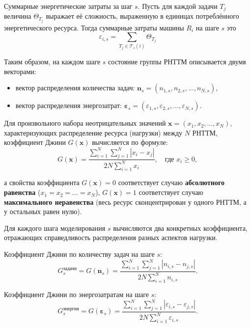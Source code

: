 Суммарные энергетические затраты за шаг $s$. Пусть для каждой задачи $T_j$ величина $\Theta_{T_j}$ выражает её сложность, выраженную в единицах потреблённого энергетического ресурса. Тогда суммарные затраты машины $R_i$ на шаге $s$ это
\begin{equation}
	\varepsilon_{i,s} = \sum_{T_j \in \mathcal{T}_s(i)} \Theta_{T_j}
\end{equation}

Таким образом, на каждом шаге $s$ состояние группы РНТТМ описывается двумя векторами:
\begin{itemize}
	\item вектор распределения количества задач: $\mathbf{n}_s = (n_{1,s}, n_{2,s}, \dots, n_{N,s})$,
	\item вектор распределения энергозатрат: $\boldsymbol{\varepsilon}_s = (\varepsilon_{1,s}, \varepsilon_{2,s}, \dots, \varepsilon_{N,s})$.
\end{itemize}

Для произвольного набора неотрицательных значений $\mathbf{x} = (x_1, x_2, \dots, x_N)$, характеризующих распределение ресурса (нагрузки) между $N$ РНТТМ, коэффициент Джини $G(\mathbf{x})$ вычисляется по формуле:
\begin{equation}
	\label{eq:gini_co}
	G(\mathbf{x}) = \frac{\displaystyle \sum_{i=1}^{N} \sum_{j=1}^{N} |x_i - x_j|}{\displaystyle 2 N \sum_{i=1}^{N} x_i}, \quad \text{где } x_i \ge 0,
\end{equation}

а свойства коэффициента $G(\mathbf{x}) = 0$ соответствует случаю \textbf{абсолютного равенства} ($x_1 = x_2 = \dots = x_N$), $G(\mathbf{x}) = 1$ соответствует случаю \textbf{максимального неравенства} (весь ресурс сконцентрирован у одного РНТТМ, а у остальных равен нулю).

Для каждого шага моделирования $s$ вычисляются два конкретных коэффициента, отражающих справедливость распределения разных аспектов нагрузки.

Коэффициент Джини по количеству задач на шаге $s$:
\begin{equation}
	G^{\text{задачи}}_s = G(\mathbf{n}_s) = \frac{\sum_{i=1}^{N} \sum_{j=1}^{N} |n_{i,s} - n_{j,s}|}{2 N \sum_{i=1}^{N} n_{i,s}}.
\end{equation}

Коэффициент Джини по энергозатратам на шаге $s$:
\begin{equation}
	G^{\text{энергия}}_s = G(\boldsymbol{\varepsilon}_s) = \frac{\sum_{i=1}^{N} \sum_{j=1}^{N} |\varepsilon_{i,s} - \varepsilon_{j,s}|}{2 N \sum_{i=1}^{N} \varepsilon_{i,s}}.
\end{equation}

